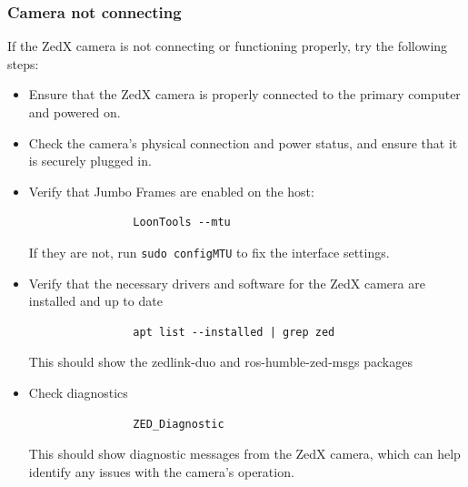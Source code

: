 \subsubsection{Camera not connecting}
If the ZedX camera is not connecting or functioning properly, try the following steps:
    \begin{itemize}
        \item Ensure that the ZedX camera is properly connected to the primary computer and powered on.
        \item Check the camera's physical connection and power status, and ensure that it is securely plugged in.
        \item Verify that Jumbo Frames are enabled on the host:
            \begin{verbatim}
                LoonTools --mtu
            \end{verbatim}
            If they are not, run \texttt{sudo configMTU} to fix the interface settings.
        \item Verify that the necessary drivers and software for the ZedX camera are installed and up to date \\
            \begin{verbatim}
                apt list --installed | grep zed
            \end{verbatim} 
            This should show the zedlink-duo and ros-humble-zed-msgs packages
        \item Check diagnostics
            \begin{verbatim}
                ZED_Diagnostic
            \end{verbatim} 
            This should show diagnostic messages from the ZedX camera, which can help identify any issues with the camera's operation.
    \end{itemize}

